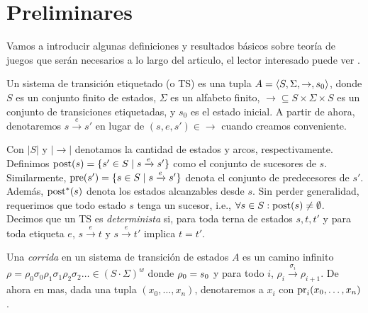 %


\section{Preliminares} \label{sec:background}

Vamos a introducir algunas definiciones y resultados básicos sobre teoría de juegos que serán necesarios a lo largo del articulo, el lector interesado puede ver \cite{AptG11}.

Un sistema de transición etiquetado (o TS) es una tupla $A =\langle S, \Sigma, \rightarrow, s_0 \rangle$, donde $S$ es un conjunto finito de estados, $\Sigma$ es un alfabeto finito,  $\rightarrow \subseteq S \times \Sigma \times S$ es un conjunto de transiciones etiquetadas, y $s_0$ es el estado inicial. A partir de ahora, denotaremos $s \xrightarrow{e} s'$ en lugar de $(s,e,s') \in \rightarrow$ cuando creamos conveniente.

Con $|S|$ y $|{\rightarrow}|$ denotamos la cantidad de estados y arcos, respectivamente. Definimos $\operatorname{post}(s) = \{s' \in S \mid s \xrightarrow{e} s' \}$ como el conjunto de sucesores de $s$. Similarmente,  $\operatorname{pre}(s') = \{s \in S \mid s \xrightarrow{e} s' \}$ denota el conjunto de predecesores de $s'$.
Además, $\operatorname{post}^{*}(s)$ denota los estados alcanzables desde $s$.
Sin perder generalidad, requerimos que todo estado $s$ tenga un sucesor, i.e., $\forall s \in S : \operatorname{post}(s) \neq \emptyset$. Decimos que un TS es \emph{determinista} si, para toda terna de estados  $s,t, t'$ y para toda etiqueta $e$, $s \xrightarrow{e} t$ y $s \xrightarrow{e} t'$ implica $t=t'$. 

Una \emph{corrida} en un sistema de transición de estados $A$ es un camino infinito $\rho = \rho_0 \sigma_0 \rho_1 \sigma_1  \rho_2 \sigma_2 \dots \in (S \cdot \Sigma)^{w}$ 
donde $\rho_0 = s_0$ y para todo $i$, $\rho_i \xrightarrow{\sigma_i} \rho_{i+1}$. De ahora en mas, dada una tupla $(x_0,\dots,x_n)$, denotaremos a $x_i$ con  $\operatorname{pr}_{i}(x_0,\dots,x_n)$.

